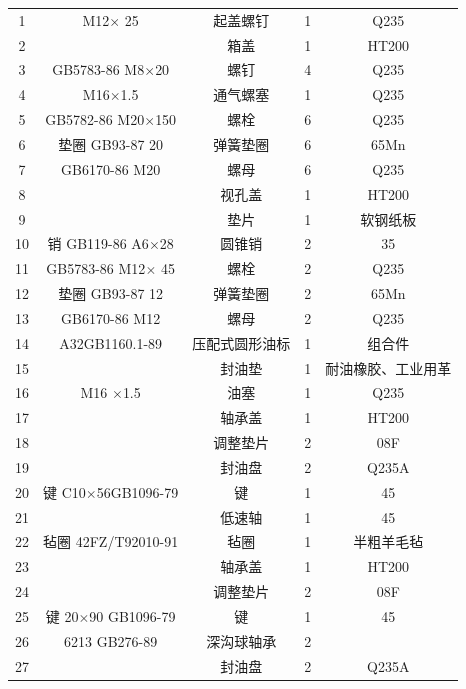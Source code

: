 \documentclass[12pt]{ctexart}
\begin{document}
\begin{center}
\begin{longtable}{ccccc}
    1 & M12$\times$ 25         & 起盖螺钉 &1  & Q235\\
    2 &                        & 箱盖     &1  & HT200\\
    3 & GB5783-86 M8$\times$20 & 螺钉     &4  &Q235\\
    4 & M16$\times$1.5         & 通气螺塞 & 1 & Q235\\
    5 & GB5782-86 M20$\times$150&螺栓     & 6 & Q235\\
    6 & 垫圈 GB93-87 20        & 弹簧垫圈  &6  & 65Mn \\
    7 & GB6170-86 M20          & 螺母     & 6 & Q235 \\
    8 &                       & 视孔盖    & 1 & HT200\\
    9 &                       &垫片       & 1 &软钢纸板\\
    10 & 销 GB119-86 A6$\times $28& 圆锥销 & 2 &35\\
    11 & GB5783-86 M12$\times $ 45 & 螺栓  & 2 & Q235\\
    12 & 垫圈 GB93-87 12          & 弹簧垫圈 &2 & 65Mn\\
    13 & GB6170-86 M12           & 螺母     & 2 & Q235\\
    14 & A32GB1160.1-89          & 压配式圆形油标 & 1 & 组合件\\
    15 &                         & 封油垫   & 1 & 耐油橡胶、工业用革\\
    16 & M16 $\times $1.5         & 油塞    & 1 & Q235\\
    17 &                         & 轴承盖  & 1 & HT200\\
    18 &                         & 调整垫片 & 2 & 08F\\
    19 &                         & 封油盘   & 2 & Q235A\\
    20 & 键 C10$\times$56GB1096-79 & 键     & 1 & 45\\
    21 &                           & 低速轴     & 1 & 45\\
    22 & 毡圈 42FZ/T92010-91       & 毡圈   & 1 & 半粗羊毛毡\\
    23 &                          & 轴承盖  & 1 & HT200\\
    24 &                          & 调整垫片 & 2 & 08F\\
    25 & 键 20$\times$90 GB1096-79& 键      & 1 & 45\\
    26 & 6213 GB276-89            & 深沟球轴承 & 2 & \\
    27 &                          & 封油盘    & 2 & Q235A\\

\end{longtable}
\end{center}
\end{document}
